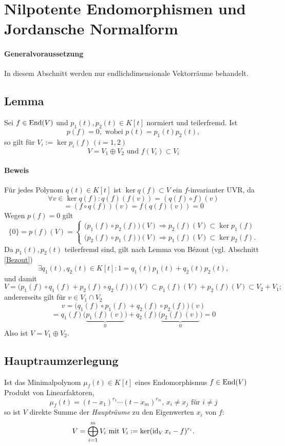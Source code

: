 \section{Nilpotente Endomorphismen und Jordansche Normalform}
\paragraph{Generalvoraussetzung}
	In diesem Abschnitt werden nur endlichdimensionale Vektorräume behandelt.
\subsection{Lemma}
	Sei $ f\in \operatorname{End}(V) $ und $ p_1(t),p_2(t)\in K[t] $ normiert und teilerfremd.
	Ist 
		\[ p(f) = 0, \text{ wobei }p(t) = p_1(t)p_2(t), \]
	so gilt für $ V_i := \ker p_i(f)\, (i=1,2)$
		\[ V=V_1\oplus V_2 \text{ und }f(V_i)\subset V_i \]
\paragraph{Beweis}
	Für jedes Polynom $ q(t)\in K[t] $ ist $ \ker q(f)\subset V $ ein $ f $-invarianter UVR, da
		\[ \forall v\in \ker q(f): q(f)(f(v)) = \left(q(f)\circ f\right)(v) \]
		\[ =\left(f\circ q(f)\right)(v) = f\left(q(f)(v)\right) = 0 \]
	Wegen $ p(f) = 0 $ gilt
		\[ \{0\} = p(f)(V) = 
		\begin{cases}
			\Big(p_1(f)\circ p_2(f)\Big)(V) \Rightarrow p_2(f)(V)\subset \ker p_1(f)\\
			\Big(p_2(f)\circ p_1(f)\Big)(V) \Rightarrow p_1(f)(V)\subset \ker p_2(f).
		\end{cases} \]
	Da $ p_1(t),p_2(t) $ teilerfremd sind, gilt nach Lemma von B\'ezont (vgl. Abschnitt \ref{Bezout})
		\[ \exists q_1(t),q_2(t)\in K[t]: 1= q_1(t)p_1(t)+q_2(t)p_2(t), \]
	und damit
		\[ V= \Big(p_1(f)\circ q_1(f)+p_2(f)\circ q_2(f) \Big)(V)\subset p_1(f)(V)+p_2(f)(V)\subset V_2+V_1; \]
	andererseits gilt für $ v\in V_1\cap V_2 $
		\[ v=\Big(q_1(f)\circ p_1(f)+q_2(f)\circ p_2(f) \Big)(v) \]
		\[ =q_1(f)\Big(\underbrace{p_1(f)(v)}_0\Big)+q_2(f)\Big(\underbrace{p_2(f)(v)}_0\Big) = 0 \]
	Also ist $ V=V_1\oplus V_2 $.
\subsection{Hauptraumzerlegung}
	Ist das Minimalpolynom $ \mu_f(t)\in K[t] $ eines Endomorphismus $ f\in \operatorname{End}(V) $ Produkt von Linearfaktoren,
		\[ \mu_f(t) = (t-x_1)^{r_1}\cdots (t-x_m)^{r_m},\, x_i\neq x_j \text{ für }i\neq j \]
	so ist $ V $ direkte Summe der \emph{Haupträume} zu den Eigenwerten $ x_i $ von $ f $:
		\[ V=\bigoplus_{i=1}^m V_i \text{ mit }V_i := \ker (\operatorname{id}_Vx_i-f)^{r_i}. \]
